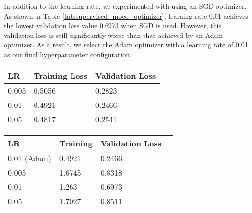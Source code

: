 \documentclass[12pt,twoside]{report}
\begin{document}
In addition to the learning rate, we experimented with using an SGD optimizer. As shown in Table \ref{tab:supervised_moco_optimizer}, learning rate 0.01 achieves the lowest validation loss value 0.6973 when SGD is used. However, this validation loss is still significantly worse than that achieved by an Adam optimizer. As a result, we select the Adam optimizer with a learning rate of 0.01 as our final hyperparameter configuration. \\

\begin{minipage}[c]{0.49\textwidth}
    \centering
    \begin{tabular}{lll}
    \toprule
    LR & Training Loss & Validation Loss \\
    \midrule
    0.005 & 0.5056 & 0.2823 \\
    0.01 & 0.4921 & 0.2466 \\
    0.05 & 0.4817 & 0.2541 \\
    \bottomrule
    \end{tabular}
    \captionsetup{type=table}
    \label{tab:supervised_moco_lr}
\end{minipage}
\begin{minipage}[c]{0.5\textwidth}
    \centering
    \begin{tabular}{llll}
    \toprule
    LR & Training & Validation Loss \\
    \midrule
    0.01 (Adam) & 0.4921 & 0.2466 \\
    \midrule
    0.005 & 1.6745 & 0.8318 \\
    0.01  & 1.263 & 0.6973 \\
    0.05  & 1.7027 & 0.8511 \\
    \bottomrule
    \end{tabular}
    \captionsetup{type=table}
    \label{tab:supervised_moco_optimizer}
\end{minipage}
\end{document}
